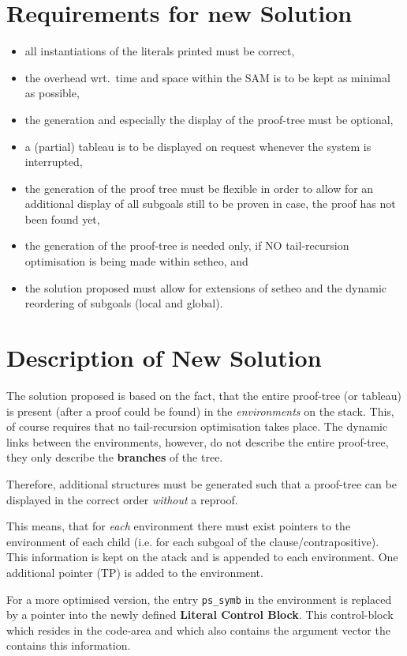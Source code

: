 \section{Requirements for new Solution}

\begin{itemize}
\item
all instantiations of the literals printed must be correct,
\item
the overhead wrt.\ time and space within the SAM is to be kept as
minimal as possible,
\item
the generation and especially the display of the proof-tree must be optional,
\item
a (partial) tableau is to be displayed on request whenever the system
is interrupted,
\item
the generation of the proof tree must be flexible in order to allow
for an additional display of all subgoals still to be proven
in case, the proof has not been found yet,
\item
the generation of the proof-tree is needed only, if NO tail-recursion
optimisation is being made within setheo, and
\item
the solution proposed must allow for extensions of setheo and
the dynamic reordering of subgoals (local and global).
\end{itemize}

\section{Description of New Solution}
The solution proposed is based on the fact, that the entire proof-tree (or
tableau) is present (after a proof could be found) in the {\em environments\/}
on the stack. This, of course requires that no tail-recursion optimisation
takes place. The dynamic links between the environments, however, do not
describe the entire proof-tree, they only describe the
{\bf branches} of the tree.

Therefore, additional structures must be generated such that a proof-tree can
be displayed in the correct order {\em without\/} a reproof.

This means, that for {\em each\/} environment there must exist pointers
to the environment of each child (i.e. for each subgoal of the
clause/contrapositive).
This information is kept on the atack and is appended to each environment.
One additional pointer (TP) is added to the environment.

For a more optimised version, the entry {\tt ps\_symb} in the environment
is replaced by a pointer into the newly defined {\bf Literal Control Block}.
This control-block which resides in the code-area and which also contains
the argument vector the contains this information.

